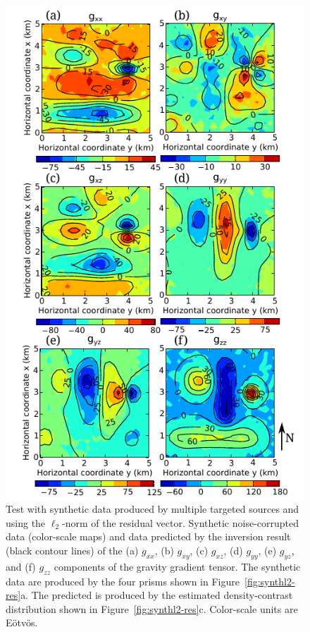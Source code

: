 \documentclass[twocolumn]{article}
\begin{document}
\begin{figure}[]
    \includegraphics{fig/synthetic-l2-fit}
    \caption{
        Test with synthetic data produced by multiple targeted sources
        and using the $\ell_{2}$-norm of the residual vector.
        Synthetic noise-corrupted data (color-scale maps) and
        data predicted by the inversion result (black contour lines)
        of the (a) $g_{xx}$, (b) $g_{xy}$, (c) $g_{xz}$, (d) $g_{yy}$, (e) $g_{yz}$, and (f) $g_{zz}$
        components of the gravity gradient tensor.
        The synthetic data are produced by
        the four prisms shown in Figure~\ref{fig:synthl2-res}a.
        The predicted is produced by
        the estimated density-contrast distribution
        shown in Figure~\ref{fig:synthl2-res}c.
        Color-scale units are E\"otv\"os.
    \label{fig:synthl2-fit}}
\end{figure}
\end{document}
